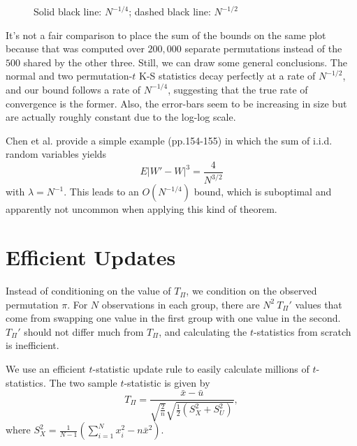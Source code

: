 \begin{figure}[!ht]
  \centering
  
  \caption{Solid black line: $N^{-1/4}$; dashed black line: $N^{-1/2}$}
\end{figure}

It's not a fair comparison to place the sum of the bounds on the same plot because that was computed
over $200,000$ separate permutations instead of the $500$ shared by the other three.  Still, we can
draw some general conclusions.  The normal and two permutation-$t$ K-S statistics decay perfectly at
a rate of $N^{-1/2}$, and our bound follows a rate of $N^{-1/4}$, suggesting that the true rate of
convergence is the former.  Also, the error-bars seem to be increasing in size but are actually
roughly constant due to the log-log scale.

Chen et al. \cite{chen2010normal} provide a simple example
(pp.154-155) in which the sum of i.i.d. random variables yields
\begin{equation*}
  E|W' - W|^3 = \frac{4}{N^{3/2}}
\end{equation*}
with $\lambda = N^{-1}$.  This leads to an $O(N^{-1/4})$ bound, which is suboptimal and apparently
not uncommon when applying this kind of theorem.

\section{Efficient Updates}
Instead of conditioning on the value of $T_{\Pi}$, we condition on the
observed permutation $\pi$.  For $N$ observations in each group, there
are $N^2 \: T_{\Pi}'$ values that come from swapping one value in the first
group with one value in the second.  $T_{\Pi}'$ should not differ much from
$T_{\Pi}$, and calculating the $t$-statistics from scratch is inefficient.  

We use an efficient $t$-statistic update rule to easily calculate
millions of $t$-statistics.  The two sample $t$-statistic is given by
\begin{equation*}
  T_{\Pi} = \frac{\bar{x}-\bar{u}}
  {\sqrt{\frac{2}{n}}\sqrt{\frac{1}{2}(S_X^2+S_U^2)}},
\end{equation*}
where $S_X^2=\frac{1}{N-1}(\sum_{i=1}^Nx_i^2-n\bar{x}^2)$.

